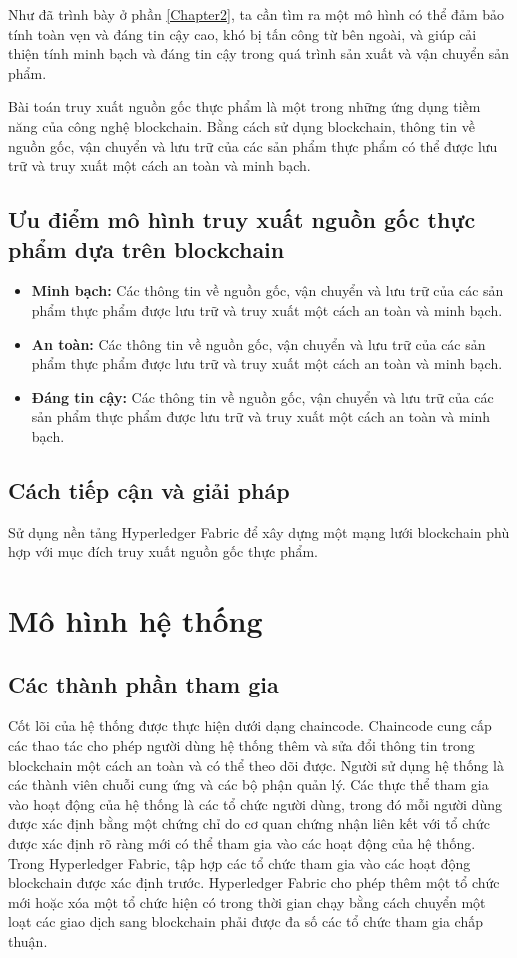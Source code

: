 Như đã trình bày ở phần \ref{Chapter2}, ta cần tìm ra một mô hình có thể đảm bảo 
tính toàn vẹn và đáng tin cậy cao, khó bị tấn công từ bên ngoài, và giúp 
cải thiện tính minh bạch và đáng tin cậy trong quá trình sản xuất và vận 
chuyển sản phẩm.  

Bài toán truy xuất nguồn gốc thực phẩm là một trong những ứng dụng tiềm năng của công nghệ 
blockchain. Bằng cách sử dụng blockchain, thông tin về nguồn gốc, vận chuyển và lưu trữ 
của các sản phẩm thực phẩm có thể được lưu trữ và truy xuất một cách an toàn và minh bạch.

\subsection{Ưu điểm mô hình truy xuất nguồn gốc thực phẩm dựa trên blockchain}
 
\begin{itemize}
    \item \textbf{Minh bạch:} Các thông tin về nguồn gốc, vận chuyển và lưu trữ của các sản phẩm 
    thực phẩm được lưu trữ và truy xuất một cách an toàn và minh bạch.
    \item \textbf{An toàn:} Các thông tin về nguồn gốc, vận chuyển và lưu trữ của các sản phẩm 
    thực phẩm được lưu trữ và truy xuất một cách an toàn và minh bạch.
    \item \textbf{Đáng tin cậy:} Các thông tin về nguồn gốc, vận chuyển và lưu trữ của các sản phẩm 
    thực phẩm được lưu trữ và truy xuất một cách an toàn và minh bạch.
\end{itemize}

\subsection{Cách tiếp cận và giải pháp}

Sử dụng nền tảng Hyperledger Fabric để xây dựng một mạng lưới blockchain phù hợp với 
mục đích truy xuất nguồn gốc thực phẩm.

\section{Mô hình hệ thống}
\subsection{Các thành phần tham gia}

Cốt lõi của hệ thống được thực hiện dưới dạng chaincode. Chaincode cung cấp các thao tác cho phép người dùng hệ thống thêm và sửa đổi 
thông tin trong blockchain một cách an toàn và có thể theo dõi được. Người sử dụng hệ thống
là các thành viên chuỗi cung ứng và các bộ phận quản lý. Các thực thể tham gia 
vào hoạt động của hệ thống là các tổ chức người dùng, trong đó mỗi người dùng được xác định 
bằng một chứng chỉ do cơ quan chứng nhận liên kết với tổ chức được xác định rõ ràng mới có thể 
tham gia vào các hoạt động của hệ thống. Trong Hyperledger Fabric, tập hợp các tổ chức tham 
gia vào các hoạt động blockchain được xác định trước. Hyperledger Fabric cho phép thêm một tổ 
chức mới hoặc xóa một tổ chức hiện có trong thời gian chạy bằng cách chuyển một loạt các 
giao dịch sang blockchain phải được đa số các tổ chức tham gia chấp thuận.

